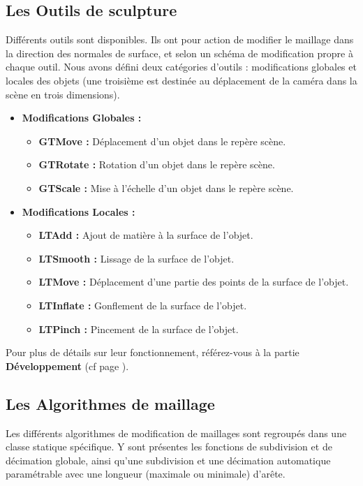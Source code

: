 \documentclass[a4paper]{memoir}
\begin{document}
			\subsection{Les Outils de sculpture}
				\label{tool-cdc}
				Différents outils sont disponibles. Ils ont pour action de modifier le maillage dans la direction des normales de surface, et selon
				un schéma de modification propre à chaque outil. Nous avons défini deux catégories d'outils : modifications globales et locales des objets
				(une troisième est destinée au déplacement de la caméra dans la scène en trois dimensions).
				\newpage
				\begin{itemize}
					\item \textbf{Modifications Globales :}
					\begin{itemize}
						\item \textbf{GTMove :} Déplacement d'un objet dans le repère scène.
						\item \textbf{GTRotate :} Rotation d'un objet dans le repère scène.
						\item \textbf{GTScale :} Mise à l'échelle d'un objet dans le repère scène.
					\end{itemize}
					\item \textbf{Modifications Locales :}
					\begin{itemize}
						\item \textbf{LTAdd :} Ajout de matière à la surface de l'objet.
						\item \textbf{LTSmooth :} Lissage de la surface de l'objet.
						\item \textbf{LTMove :} Déplacement d'une partie des points de la surface de l'objet.
						\item \textbf{LTInflate :} Gonflement de la surface de l'objet.
						\item \textbf{LTPinch :} Pincement de la surface de l'objet.
					\end{itemize}
				\end{itemize}
				Pour plus de détails sur leur fonctionnement, référez-vous à la partie \textbf{Développement} (cf page \pageref{tool-dev}).

			\subsection{Les Algorithmes de maillage}
				Les différents algorithmes de modification de maillages sont regroupés dans une classe statique spécifique. Y sont présentes les 
				fonctions de subdivision et de décimation globale, ainsi qu'une subdivision et une décimation automatique paramétrable avec une longueur 
				(maximale ou minimale) d'arête.
\end{document}
